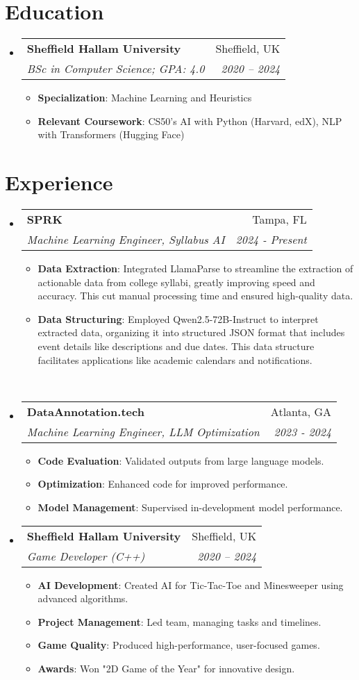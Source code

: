 \documentclass[letterpaper,11pt]{article}
\makeatletter
\newcommand{\resumeItem}[2]{
  \item\small{
    \textbf{#1}{: #2 \vspace{-2pt}}
  }
}
\newcommand{\resumeSubheading}[4]{
  \vspace{-1pt}\item
    \begin{tabular*}{0.97\textwidth}{l@{\extracolsep{\fill}}r}
      \textbf{#1} & #2 \\
      \textit{\small#3} & \textit{\small #4} \\
    \end{tabular*}\vspace{-5pt}
}
\newcommand{\resumeSubHeadingListStart}{\begin{itemize}[leftmargin=*, itemsep=0pt]}
\newcommand{\resumeSubHeadingListEnd}{\end{itemize}}
\newcommand{\resumeItemListStart}{\begin{itemize}[itemsep=0pt]}
\newcommand{\resumeItemListEnd}{\end{itemize}\vspace{-5pt}}
\makeatother
\begin{document}
\section{Education}
 \resumeSubHeadingListStart
    \resumeSubheading
      {Sheffield Hallam University}{Sheffield, UK}
      {BSc in Computer Science; GPA: 4.0}{2020 -- 2024}
      \resumeItemListStart
        \resumeItem{Specialization}{Machine Learning and Heuristics}
        \resumeItem{Relevant Coursework}{CS50's AI with Python (Harvard, edX), NLP with Transformers (Hugging Face)}
      \resumeItemListEnd
  \resumeSubHeadingListEnd
\vspace{-0.5cm} %

\section{Experience}
\resumeSubHeadingListStart
    \resumeSubheading
      {SPRK}{Tampa, FL}
      {Machine Learning Engineer, Syllabus AI}{2024 - Present}
      \resumeItemListStart
        \resumeItem{Data Extraction}{Integrated LlamaParse to streamline the extraction of actionable data from college syllabi, greatly improving speed and accuracy. This cut manual processing time and ensured high-quality data.}
        \resumeItem{Data Structuring}{Employed Qwen2.5-72B-Instruct to interpret extracted data, organizing it into structured JSON format that includes event details like descriptions and due dates. This data structure facilitates applications like academic calendars and notifications.}
      \resumeItemListEnd
\



    \resumeSubheading
      {DataAnnotation.tech}{Atlanta, GA}
      {Machine Learning Engineer, LLM Optimization}{2023 - 2024}
      \resumeItemListStart
        \resumeItem{Code Evaluation}{Validated outputs from large language models.}
        \resumeItem{Optimization}{Enhanced code for improved performance.}
        \resumeItem{Model Management}{Supervised in-development model performance.}
      \resumeItemListEnd

    \resumeSubheading
      {Sheffield Hallam University}{Sheffield, UK}
      {Game Developer (C++)}{2020 -- 2024}
      \resumeItemListStart
        \resumeItem{AI Development}{Created AI for Tic-Tac-Toe and Minesweeper using advanced algorithms.}
        \resumeItem{Project Management}{Led team, managing tasks and timelines.}
        \resumeItem{Game Quality}{Produced high-performance, user-focused games.}
        \resumeItem{Awards}{Won "2D Game of the Year" for innovative design.}
      \resumeItemListEnd
  \resumeSubHeadingListEnd
\vspace{-0.5cm}
\end{document}
